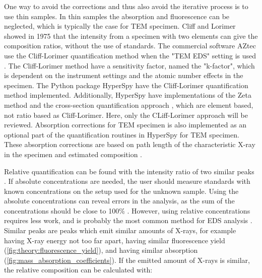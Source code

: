 One way to avoid the corrections and thus also avoid the iterative process is to use thin samples.
In thin samples the absorption and fluorescence can be neglected, which is typically the case for TEM specimen.
Cliff and Lorimer \cite{CL1975} showed in 1975 that the intensity from a specimen with two elements can give the composition ratios, without the use of standards.
The commercial software AZtec \cite{aztec_manual} use the Cliff-Lorimer quantification method when the "TEM EDS" setting is used \cite{oxford_blog_CL}.
The Cliff-Lorimer method have a sensitivity factor, named the "k-factor", which is dependent on the instrument settings and the atomic number effects in the specimen.
The Python package HyperSpy have the Cliff-Lorimer quantification method implemented.
Additionally, HyperSpy have implementations of the Zeta method \cite{watanabe_williams_zeta_2006} and the cross-section quantification approach \cite{MacArthur_crosssection_2016}, which are element based, not ratio based as Cliff-Lorimer. 
Here, only the CLiff-Lorimer approach will be reviewed.
Absorption corrections for TEM specimen is also implemented as an optional part of the quantification routines in HyperSpy for TEM specimen.
These absorption corrections are based on path length of the characteristic X-ray in the specimen and estimated composition \cite{williams_carter_tem_2009}.




Relative quantification can be found with the intensity ratio of two similar peaks \cite{goldstein_scanning_2018}.
If absolute concentrations are needed, the user should measure standards with known concentrations on the setup used for the unknown sample.
Using the absolute concentrations can reveal errors in the analysis, as the sum of the concentrations should be close to 100\% \cite{goldstein_scanning_2018}.
However, using relative concentrations requires less work, and is probably the most common method for EDS analysis \cite{goldstein_scanning_2018}.
Similar peaks are peaks which emit similar amounts of X-rays, for example having X-ray energy not too far apart, having similar fluorescence yield (\cref{fig:theory:fluorescence_yield}), and having similar absorption (\cref{fig:mass_absorption_coefficients}).
If the emitted amount of X-rays is similar, the relative composition can be calculated with:

